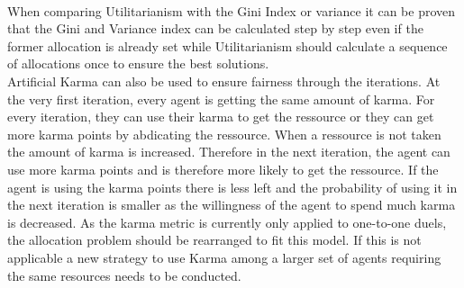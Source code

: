 \documentclass[german, a4paper, 11pt, oneside]{scrbook}
\begin{document}
\\
When comparing Utilitarianism with the Gini Index or variance it can be proven that the Gini and Variance index can be calculated step by step even if the former allocation is already set while Utilitarianism should calculate a sequence of allocations once to ensure the best solutions.
\\Artificial Karma can also be used to ensure fairness through the iterations. At the very first iteration, every agent is getting the same amount of karma. For every iteration, they can use their karma to get the ressource or they can get more karma points by abdicating the ressource. When a ressource is not taken the amount of karma is increased. Therefore in the next iteration, the agent can use more karma points and is therefore more likely to get the ressource. If the agent is using the karma points there is less left and the probability of using it in the next iteration is smaller as the willingness of the agent to spend much karma is decreased. As the karma metric is currently only applied to one-to-one duels, the allocation problem should be rearranged to fit this model. If this is not applicable a new strategy to use Karma among a larger set of agents requiring the same resources needs to be conducted. 
\end{document}
